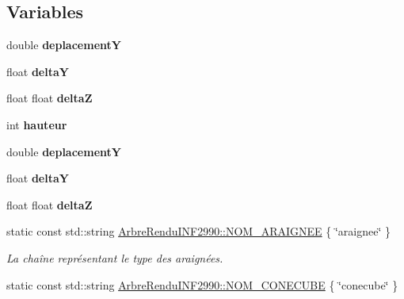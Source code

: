 \subsection*{Variables}
\begin{DoxyCompactItemize}
\item 
double {\bfseries deplacement\-Y}
\item 
\hypertarget{group__inf2990_ga44ef3d47a1eab85511f25ca8cdf94a8a}{float {\bfseries delta\-Y}}\label{group__inf2990_ga44ef3d47a1eab85511f25ca8cdf94a8a}

\item 
float float {\bfseries delta\-Z}
\item 
\hypertarget{group__inf2990_ga5e94a2f98c16e8b6860f95c99da1c0d3}{int {\bfseries hauteur}}\label{group__inf2990_ga5e94a2f98c16e8b6860f95c99da1c0d3}

\item 
\hypertarget{group__inf2990_ga84b180f09e9802d980aa3f7cc71703da}{double {\bfseries deplacement\-Y}}\label{group__inf2990_ga84b180f09e9802d980aa3f7cc71703da}

\item 
\hypertarget{group__inf2990_ga44ef3d47a1eab85511f25ca8cdf94a8a}{float {\bfseries delta\-Y}}\label{group__inf2990_ga44ef3d47a1eab85511f25ca8cdf94a8a}

\item 
\hypertarget{group__inf2990_ga9644447719a7934b7eca34bdf6656363}{float float {\bfseries delta\-Z}}\label{group__inf2990_ga9644447719a7934b7eca34bdf6656363}

\item 
\hypertarget{group__inf2990_ga1035430c1c08b95d17f891ae89b33b80}{static const std\-::string \hyperlink{group__inf2990_ga1035430c1c08b95d17f891ae89b33b80}{Arbre\-Rendu\-I\-N\-F2990\-::\-N\-O\-M\-\_\-\-A\-R\-A\-I\-G\-N\-E\-E} \{ \char`\"{}araignee\char`\"{} \}}\label{group__inf2990_ga1035430c1c08b95d17f891ae89b33b80}

\begin{DoxyCompactList}\small\item\em La chaîne représentant le type des araignées. \end{DoxyCompactList}\item 
\hypertarget{group__inf2990_gae849656178f4dad34106f525bf37341a}{static const std\-::string \hyperlink{group__inf2990_gae849656178f4dad34106f525bf37341a}{Arbre\-Rendu\-I\-N\-F2990\-::\-N\-O\-M\-\_\-\-C\-O\-N\-E\-C\-U\-B\-E} \{ \char`\"{}conecube\char`\"{} \}}\label{group__inf2990_gae849656178f4dad34106f525bf37341a}


\end{DoxyCompactItemize}
